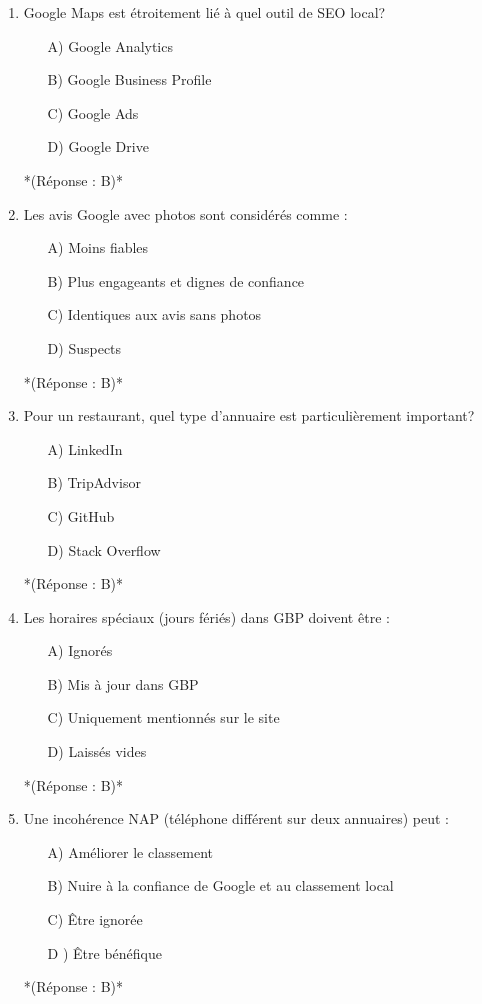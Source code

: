 \documentclass[12pt,a4paper,twoside]{report}
\begin{document}
\begin{enumerate}
\item Google Maps est étroitement lié à quel outil de SEO local?
\begin{itemize}
\item[A)] Google Analytics
\item[B)] Google Business Profile
\item[C)] Google Ads
\item[D)] Google Drive
\end{itemize}
*(Réponse : B)*

\item Les avis Google avec photos sont considérés comme :
\begin{itemize}
\item[A)] Moins fiables
\item[B)] Plus engageants et dignes de confiance
\item[C)] Identiques aux avis sans photos
\item[D)] Suspects
\end{itemize}
*(Réponse : B)*

\item Pour un restaurant, quel type d'annuaire est particulièrement important?
\begin{itemize}
\item[A)] LinkedIn
\item[B)] TripAdvisor
\item[C)] GitHub
\item[D)] Stack Overflow
\end{itemize}
*(Réponse : B)*

\item Les horaires spéciaux (jours fériés) dans GBP doivent être :
\begin{itemize}
\item[A)] Ignorés
\item[B)] Mis à jour dans GBP
\item[C)] Uniquement mentionnés sur le site
\item[D)] Laissés vides
\end{itemize}
*(Réponse : B)*

\item Une incohérence NAP (téléphone différent sur deux annuaires) peut :
\begin{itemize}
\item[A)] Améliorer le classement
\item[B)] Nuire à la confiance de Google et au classement local
\item[C)] Être ignorée
\item[D]) Être bénéfique
\end{itemize}
*(Réponse : B)*


\end{enumerate}
\end{document}
